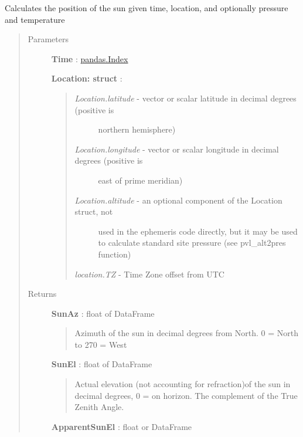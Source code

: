 \documentclass[letterpaper,10pt,english]{sphinxmanual}
\begin{document}
\begin{fulllineitems}
\label{stubs/pvlib.pvl_ephemeris:pvlib.pvl_ephemeris}
Calculates the position of the sun given time, location, and optionally pressure and temperature
\begin{quote}\begin{description}
\item[{Parameters}] \leavevmode
\textbf{Time} :  \href{http://pandas.pydata.org/pandas-docs/version/0.13.1/generated/pandas.Index.html}{pandas.Index}

\textbf{Location: struct} :
\begin{quote}
\begin{description}
\item[{\emph{Location.latitude} - vector or scalar latitude in decimal degrees (positive is}] \leavevmode
northern hemisphere)

\item[{\emph{Location.longitude} - vector or scalar longitude in decimal degrees (positive is }] \leavevmode
east of prime meridian)

\item[{\emph{Location.altitude} - an optional component of the Location struct, not}] \leavevmode
used in the ephemeris code directly, but it may be used to calculate
standard site pressure (see pvl\_alt2pres function)

\end{description}

\emph{location.TZ}     - Time Zone offset from UTC
\end{quote}

\item[{Returns}] \leavevmode
\textbf{SunAz} : float of DataFrame
\begin{quote}

Azimuth of the sun in decimal degrees from North. 0 = North to 270 = West
\end{quote}

\textbf{SunEl} : float of DataFrame
\begin{quote}

Actual elevation (not accounting for refraction)of the sun 
in decimal degrees, 0 = on horizon. The complement of the True Zenith
Angle.
\end{quote}

\textbf{ApparentSunEl} : float or DataFrame
\begin{quote}


\end{quote}
\end{description}
\end{quote}
\end{fulllineitems}
\end{document}
